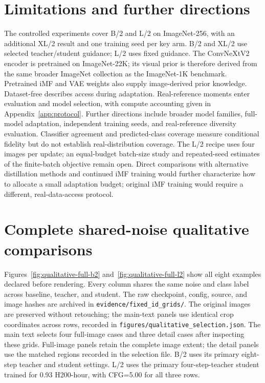 \section{Limitations and further directions}
\label{app:scope}
The controlled experiments cover B/2 and L/2 on ImageNet-256, with an
additional XL/2 result and one training seed per key arm.
B/2 and XL/2 use selected teacher/student guidance; L/2 uses
fixed guidance. The ConvNeXtV2 encoder is pretrained on ImageNet-22K;
its visual prior is therefore derived from the same broader ImageNet
collection as the ImageNet-1K benchmark. Pretrained iMF and VAE weights
also supply image-derived prior knowledge. Dataset-free describes access
during adaptation. Real-reference moments enter evaluation
and model selection, with compute accounting given in
Appendix~\ref{app:protocol}. Further directions include broader model
families, full-model adaptation, independent training seeds, and
real-reference diversity evaluation. Classifier agreement and predicted-class
coverage measure conditional fidelity but do not establish real-distribution
coverage. The L/2 recipe uses four images per update; an equal-budget
batch-size study and repeated-seed estimates of the finite-batch objective
remain open. Direct comparisons with alternative distillation methods
and continued iMF training would further characterize how to allocate a
small adaptation budget; original iMF training would require a different,
real-data-access protocol.


\section{Complete shared-noise qualitative comparisons}
\label{app:qualitative}
Figures~\ref{fig:qualitative-full-b2} and~\ref{fig:qualitative-full-l2}
show all eight examples declared before rendering. Every column shares
the same noise and class label across baseline, teacher, and student.
The raw checkpoint, config, source, and image hashes are archived in
\texttt{evidence/fixed\_id\_grids/}. The original images are preserved
without retouching; the main-text panels use identical crop coordinates
across rows, recorded in \texttt{figures/qualitative\_selection.json}.
The main text selects four full-image cases and three detail cases after
inspecting these grids. Full-image panels retain the complete image extent;
the detail panels use the matched regions recorded in the selection file.
B/2 uses its primary eight-step teacher and student settings. L/2 uses
the primary four-step-teacher student trained for 0.93 H200-hour, with
CFG=5.00 for all three rows.


